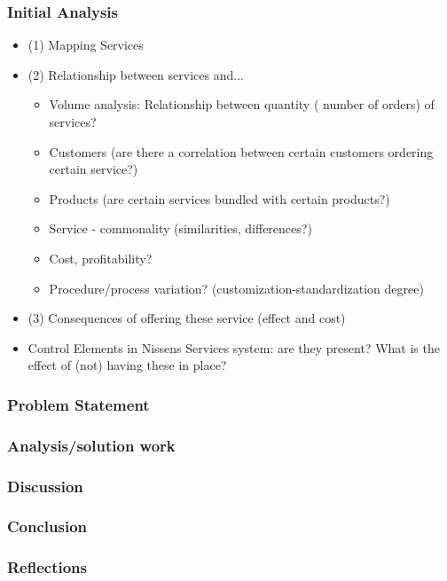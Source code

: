 \subsubsection{Initial Analysis}
    \begin{itemize}
        \item (1) Mapping Services
        \item (2) Relationship between services and...
            \begin{itemize}
                \item Volume analysis: Relationship between quantity ( number of orders) of services? 
                \item Customers (are there a correlation between certain customers ordering certain service?)
                \item Products (are certain services bundled with certain products?)
                \item Service - commonality (similarities, differences?)
                \item Cost, profitability?
                \item Procedure/process variation? (customization-standardization degree)
            \end{itemize}
        \item (3) Consequences of offering these service (effect and cost)
            \item Control Elements in Nissens Services system: are they present? What is the effect of (not) having these in place?
    \end{itemize}

\subsubsection{Problem Statement}

\subsubsection{Analysis/solution work}

\subsubsection{Discussion}

\subsubsection{Conclusion}

\subsubsection{Reflections}

